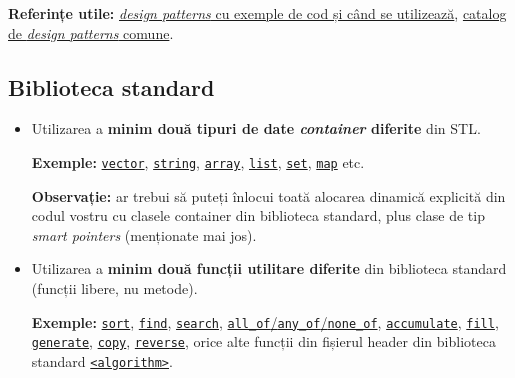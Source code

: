 \textbf{Referințe utile:} \href{https://www.oodesign.com/}{\emph{design patterns} cu exemple de cod și când se utilizează}, \href{https://refactoring.guru/design-patterns/catalog}{catalog de \emph{design patterns} comune}.

\subsection*{Biblioteca standard}

\begin{itemize}
    \item Utilizarea a \textbf{minim două tipuri de date \textit{container} diferite} din STL.
    
    \textbf{Exemple:} \href{https://en.cppreference.com/w/cpp/container/vector}{\texttt{vector}}, \href{https://en.cppreference.com/w/cpp/string/basic_string}{\texttt{string}}, \href{https://en.cppreference.com/w/cpp/container/array}{\texttt{array}}, \href{https://en.cppreference.com/w/cpp/container/list}{\texttt{list}}, \href{https://en.cppreference.com/w/cpp/container/set}{\texttt{set}}, \href{https://en.cppreference.com/w/cpp/container/map}{\texttt{map}} etc.

    \textbf{Observație:} ar trebui să puteți înlocui toată alocarea dinamică explicită din codul vostru cu clasele container din biblioteca standard, plus clase de tip \emph{smart pointers} (menționate mai jos).

    \item Utilizarea a \textbf{minim două funcții utilitare diferite} din biblioteca standard (funcții libere, nu metode).

    \textbf{Exemple:} \href{https://en.cppreference.com/w/cpp/algorithm/sort}{\texttt{sort}}, 
    \href{https://en.cppreference.com/w/cpp/algorithm/find}{\texttt{find}}, \href{https://en.cppreference.com/w/cpp/algorithm/search}{\texttt{search}}, 
    \href{https://en.cppreference.com/w/cpp/algorithm/all_any_none_of}{\texttt{all\_of}/\texttt{any\_of}/\texttt{none\_of}},
    \href{https://en.cppreference.com/w/cpp/algorithm/accumulate}{\texttt{accumulate}}, 
    \href{https://en.cppreference.com/w/cpp/algorithm/fill}{\texttt{fill}},
    \href{https://en.cppreference.com/w/cpp/algorithm/generate}{\texttt{generate}}, \href{https://en.cppreference.com/w/cpp/algorithm/copy}{\texttt{copy}}, \href{https://en.cppreference.com/w/cpp/algorithm/reverse}{\texttt{reverse}}, orice alte funcții din fișierul header din biblioteca standard \href{https://cplusplus.com/reference/algorithm/}{\texttt{<algorithm>}}.
\end{itemize}

